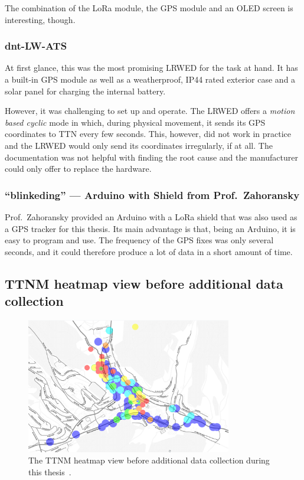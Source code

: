 The combination of the \ac{LoRa} module, the \ac{GPS} module and an \ac{OLED} screen is interesting, though.

\subsubsection{dnt-LW-ATS}

At first glance, this was the most promising \acl{LRWED} for the task at hand.
It has a built-in \ac{GPS} module as well as a weatherproof, IP44 rated exterior case and a solar panel for charging the internal battery.

However, it was challenging to set up and operate.
The \acl{LRWED} offers a \emph{motion based cyclic} mode in which, during physical movement, it sends its \ac{GPS} coordinates to \ac{TTN} every few seconds.
This, however, did not work in practice and the \acl{LRWED} would only send its coordinates irregularly, if at all.
The documentation was not helpful with finding the root cause and the manufacturer could only offer to replace the hardware.

\subsubsection{``blinkeding'' --- Arduino with Shield from Prof.\ Zahoransky}

Prof.\ Zahoransky provided an Arduino with a \ac{LoRa} shield that was also used as a \ac{GPS} tracker for this thesis.
Its main advantage is that, being an Arduino, it is easy to program and use.
The frequency of the \ac{GPS} fixes was only several seconds, and it could therefore produce a lot of data in a short amount of time.

\subsection{\acl{TTNM} heatmap view before additional data collection}

\begin{figure}[htbp]
    \centering
    \includegraphics[width=0.8\textwidth]{pictures/ttn-mapper/ttnmapper_heatmap_before.png}
    \caption{
        The \ac{TTNM} heatmap view before additional data collection during this thesis~\cite{ttn_mapper_ttn_2023}.
    }\label{pic:ttnm-before-data-collection}
\end{figure}

